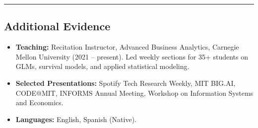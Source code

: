 \documentclass[10pt,letterpaper]{article}
\newcommand{\hsep}{\noindent\textcolor{gray}{\rule{\textwidth}{0.5pt}}}
\newcommand{\block}[1]{\begin{samepage}\hsep\subsection*{#1}\end{samepage}}
\begin{document}
\block{Additional Evidence}

\begin{itemize}[leftmargin=0pt, label={}]
\item \textbf{Teaching:} Recitation Instructor, Advanced Business Analytics, Carnegie Mellon University (2021 -- present). Led weekly sections for 35+ students on GLMs, survival models, and applied statistical modeling.
\item \textbf{Selected Presentations:} Spotify Tech Research Weekly, MIT BIG.AI, CODE@MIT, INFORMS Annual Meeting, Workshop on Information Systems and Economics.
\item \textbf{Languages:} English, Spanish (Native).
\end{itemize}
\end{document}
